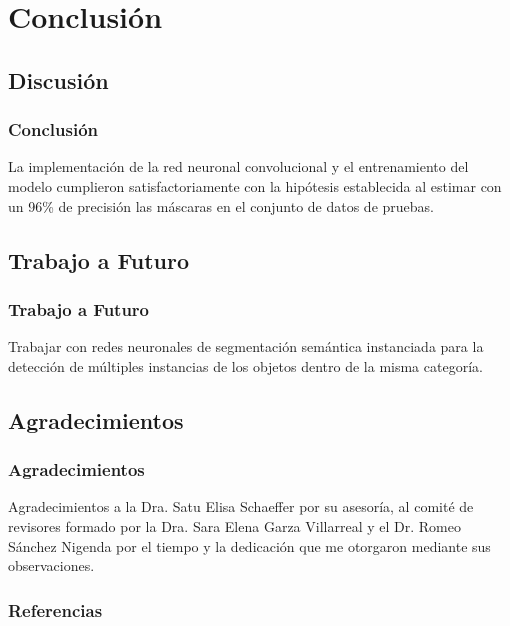 \documentclass{beamer}
\begin{document}
\section{Conclusión}
\subsection{Discusión}
\begin{frame}
    \frametitle{Conclusión}
    La implementación de la red neuronal convolucional y el entrenamiento del modelo cumplieron satisfactoriamente con la hipótesis establecida al estimar con un 96\% de precisión las máscaras en el conjunto de datos de pruebas.
\end{frame}

\subsection{Trabajo a Futuro}
\begin{frame}
    \frametitle{Trabajo a Futuro}
    Trabajar con redes neuronales de segmentación semántica instanciada para la detección de múltiples instancias de los objetos dentro de la misma categoría. 
\end{frame}

\subsection{Agradecimientos}
\begin{frame}
    \frametitle{Agradecimientos}
    Agradecimientos a la Dra. Satu Elisa Schaeffer por su asesoría, al comité de revisores formado por la Dra. Sara Elena Garza Villarreal y el Dr. Romeo Sánchez Nigenda por el tiempo y la dedicación que me otorgaron mediante sus observaciones.
\end{frame}

\begin{frame}[allowframebreaks]
    \footnotesize
    \nocite{adam_opt}
    \frametitle{Referencias}
    
    
    
    
\end{frame}
\end{document}

